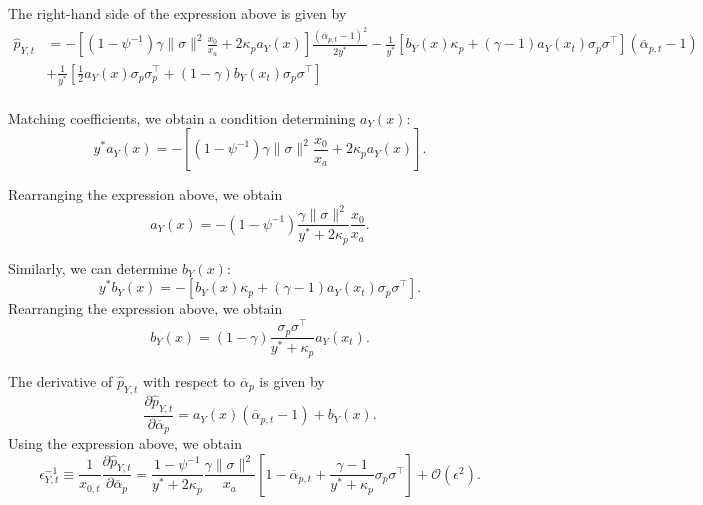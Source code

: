 The right-hand side of the expression above is given by
\begin{align}
    \hat{p}_{Y,t} &= 
    -\left[(1-\psi^{-1}) \gamma\|\sigma\|^2 \frac{x_0}{x_a} + 2\kappa_p a_Y(x) \right] \frac{(\overline{\alpha}_{p,t}-1)^2}{2 y^*} 
 - \frac{1}{y^*} \left[b_Y(x) \kappa_p +(\gamma-1)  a_Y(x_t)\sigma_p \sigma^\top \right] (\overline{\alpha}_{p,t}-1) \\
 &+ \frac{1}{y^*} \left[ \frac{1}{2} a_Y(x) \sigma_p \sigma_p^\top + (1-\gamma) b_Y(x_t) \sigma_p \sigma^\top \right]\\
\end{align}

Matching coefficients, we obtain a condition determining $a_Y(x)$:
\begin{equation}
    y^* a_Y(x) = -\left[(1-\psi^{-1}) \gamma\|\sigma\|^2 \frac{x_0}{x_a} + 2\kappa_p a_Y(x) \right].
\end{equation}

Rearranging the expression above, we obtain
\begin{equation}
    a_Y(x) = - (1-\psi^{-1}) \frac{\gamma\|\sigma\|^2}{y^* + 2\kappa_p} \frac{x_0}{x_a}.
\end{equation}

Similarly, we can determine $b_Y(x)$:
\begin{equation}
    y^* b_Y(x) = -\left[b_Y(x) \kappa_p +(\gamma-1)  a_Y(x_t)\sigma_p \sigma^\top \right].
\end{equation}
Rearranging the expression above, we obtain
\begin{equation}
    b_Y(x) =  (1-\gamma)  \frac{\sigma_p \sigma^\top}{y^* + \kappa_p}a_Y(x_t).
\end{equation}

The derivative of $\hat{p}_{Y,t}$ with respect to $\overline{\alpha}_p$ is given by
\begin{equation}    
    \frac{\partial \hat{p}_{Y,t}}{\partial \overline{\alpha}_p} = a_Y(x) (\overline{\alpha}_{p,t}-1) + b_Y(x).
\end{equation}
Using the expression above, we obtain
\begin{equation}
  \epsilon_{Y,t}^{-1} \equiv  \frac{1}{x_{0,t}}\frac{\partial \hat{p}_{Y,t}}{\partial \overline{\alpha}_p} =  \frac{1-\psi^{-1}}{y^* + 2\kappa_p} \frac{\gamma\|\sigma\|^2}{x_a} \left[ 1- \overline{\alpha}_{p,t} + \frac{\gamma-1}{y^* + \kappa_p}\sigma_p \sigma^\top\right] + \mathcal{O}(\epsilon^2).
\end{equation}

